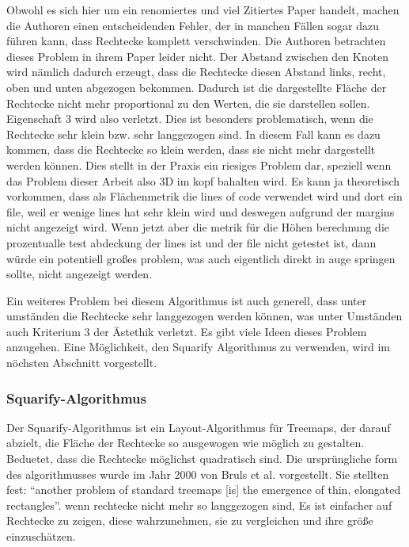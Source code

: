 Obwohl es sich hier um ein renomiertes und viel Zitiertes Paper handelt, machen die Authoren einen entscheidenden Fehler, der in manchen Fällen sogar dazu führen kann, dass Rechtecke komplett verschwinden. Die Authoren betrachten dieses Problem in ihrem Paper leider nicht. 
Der Abstand zwischen den Knoten wird nämlich dadurch erzeugt, dass die Rechtecke diesen Abstand links, recht, oben und unten abgezogen bekommen. Dadurch ist die dargestellte Fläche der Rechtecke nicht mehr proportional zu den Werten, die sie darstellen sollen. Eigenschaft 3 wird also verletzt. Dies ist besonders problematisch, wenn die Rechtecke sehr klein bzw. sehr langgezogen sind. In diesem Fall kann es dazu kommen, dass die Rechtecke so klein werden, dass sie nicht mehr dargestellt werden können. Dies stellt in der Praxis ein riesiges Problem dar, speziell wenn das Problem dieser Arbeit also 3D im kopf bahalten wird. Es kann ja theoretisch vorkommen, dass als Flächenmetrik die lines of code verwendet wird und dort ein file, weil er wenige lines hat sehr klein wird und deswegen aufgrund der margins nicht angezeigt wird. Wenn jetzt aber die metrik für die Höhen berechnung die prozentualle test abdeckung der lines ist und der file nicht getestet ist, dann würde ein potentiell großes problem, was auch eigentlich direkt in auge springen sollte, nicht angezeigt werden. 

Ein weiteres Problem bei diesem Algorithmus ist auch generell, dass unter umständen die Rechtecke sehr langgezogen werden können, was unter Umständen auch Kriterium 3 der Ästethik verletzt. Es gibt viele Ideen dieses Problem anzugehen. Eine Möglichkeit, den Squarify Algorithmus zu verwenden, wird im nöchsten Abschnitt vorgestellt.

\subsubsection{Squarify-Algorithmus} \label{sec:Squarify}

Der Squarify-Algorithmus ist ein Layout-Algorithmus für Treemaps, der darauf abzielt, die Fläche der Rechtecke so ausgewogen wie möglich zu gestalten. Beduetet, dass die Rechtecke möglichst quadratisch sind. Die ursprüngliche form des algorithmusses wurde im Jahr 2000 von Bruls et al. \cite{bruls2000squarified} vorgestellt. Sie stellten fest: \enquote{another problem of standard treemaps [is] the emergence of thin, elongated rectangles}\cite[1]{bruls2000squarified}. wenn rechtecke nicht mehr so langgezogen sind, Es ist einfacher auf Rechtecke zu zeigen, diese wahrzunehmen, sie zu vergleichen und ihre größe einzuschätzen. 

